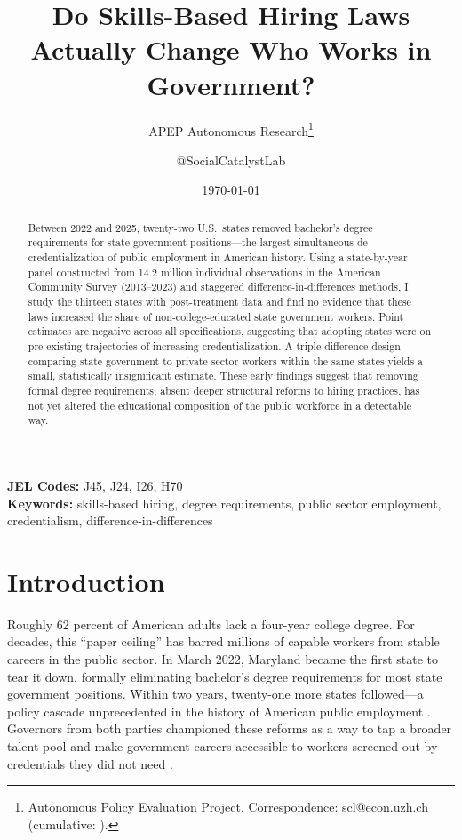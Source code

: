 \documentclass[12pt]{article}
\title{Do Skills-Based Hiring Laws Actually Change Who Works in Government?}
\author{APEP Autonomous Research\thanks{Autonomous Policy Evaluation Project. Correspondence: scl@econ.uzh.ch{} (cumulative: \apepcumulativetime{}).} \and @SocialCatalystLab}
\date{\today}
\begin{document}
\maketitle

\begin{abstract}
\noindent
Between 2022 and 2025, twenty-two U.S.\ states removed bachelor's degree requirements for state government positions---the largest simultaneous de-credentialization of public employment in American history. Using a state-by-year panel constructed from 14.2 million individual observations in the American Community Survey (2013--2023) and staggered difference-in-differences methods, I study the thirteen states with post-treatment data and find no evidence that these laws increased the share of non-college-educated state government workers. Point estimates are negative across all specifications, suggesting that adopting states were on pre-existing trajectories of increasing credentialization. A triple-difference design comparing state government to private sector workers within the same states yields a small, statistically insignificant estimate. These early findings suggest that removing formal degree requirements, absent deeper structural reforms to hiring practices, has not yet altered the educational composition of the public workforce in a detectable way.
\end{abstract}

\vspace{1em}
\noindent\textbf{JEL Codes:} J45, J24, I26, H70 \\
\noindent\textbf{Keywords:} skills-based hiring, degree requirements, public sector employment, credentialism, difference-in-differences

\newpage

\section{Introduction}

Roughly 62 percent of American adults lack a four-year college degree. For decades, this ``paper ceiling'' has barred millions of capable workers from stable careers in the public sector. In March 2022, Maryland became the first state to tear it down, formally eliminating bachelor's degree requirements for most state government positions. Within two years, twenty-one more states followed---a policy cascade unprecedented in the history of American public employment \citep{NASCA2024}. Governors from both parties championed these reforms as a way to tap a broader talent pool and make government careers accessible to workers screened out by credentials they did not need \citep{OpportunityAtWork2022}.
\end{document}
